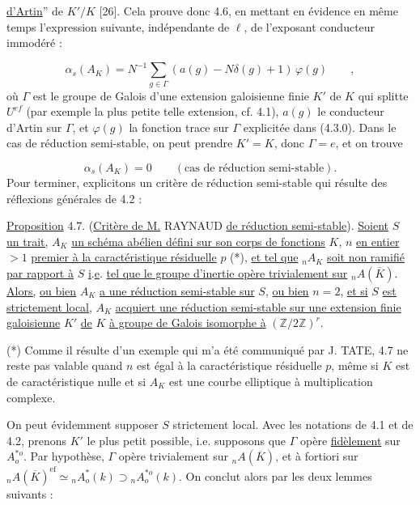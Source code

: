
\underline{d'Artin}'' de $K'/K$ [26]. Cela prouve donc 4.6, en mettant en évidence en même temps l'expression suivante, indépendante de $\ell$, de l'exposant conducteur immodéré :

\begin{equation}\tag{4.6.2}
\alpha_s(A_K) = N^{-1} \sum_{g \in \Gamma} (a(g)-N\delta(g)+1)\, \varphi(g) \qquad ,
\end{equation}
où $\Gamma$ est le groupe de Galois d'une extension galoisienne finie $K'$ de $K$ qui splitte $U^{ef}$ (par exemple la plus petite telle extension, cf. 4.1), $a(g)$ le conducteur d'Artin sur $\Gamma$, et $\varphi(g)$ la fonction trace sur $\Gamma$ explicitée dans (4.3.0). Dans le cas de réduction semi-stable, on peut prendre $K'=K$, donc $\Gamma = e$, et on trouve

\begin{equation}\tag{4.6.3}
\alpha_s(A_K) = 0 \qquad (\mbox{cas de réduction semi-stable}).
\end{equation}
Pour terminer, explicitons un critère de réduction semi-stable qui résulte des réflexions générales de 4.2 :

\underline{Proposition} 4.7. (\underline{Critère de M.} RAYNAUD \underline{de réduction semi-stable}). \underline{Soient} $S$ \underline{un trait,} $A_K$ \underline{un schéma abélien défini sur son corps de fonctions} $K$, $n$ \underline{en entier} $> 1$ \underline{premier à la caractéristique résiduelle} $p$ (*), \underline{et tel que} ${}_nA_K$ \underline{soit non ramifié par rapport à} $S$ \underline{i}.\underline{e}. \underline{tel que le groupe d'inertie opère trivialement sur} ${}_nA(\overline{K})$. \underline{Alors,} \underline{ou bien} $A_K$ \underline{a une réduction semi-stable sur} $S$, \underline{ou bien} $n = 2$, \underline{et si} $S$ \underline{est strictement local}, $A_K$ \underline{acquiert une réduction semi-stable sur une extension finie galoisienne} $K'$ \underline{de} $K$ \underline{à groupe de Galois isomorphe à} $(\mathbb{Z}/2\mathbb{Z})^r$.

(*) Comme il résulte d'un exemple qui m'a été communiqué par J. TATE, 4.7 ne reste pas valable quand $n$ est égal à la caractéristique résiduelle $p$, même si $K$ est de caractéristique nulle et si $A_K$ est une courbe elliptique à multiplication complexe.



On peut évidemment supposer $S$ strictement local. Avec les notations de 4.1 et de 4.2, prenons $K'$ le plus petit possible, i.e. supposons que $\Gamma$ opère \underline{fidèlement} sur $A^{*o}_o$. Par hypothèse, $\Gamma$ opère trivialement sur ${}_nA(\overline{K})$, et à fortiori sur ${}_nA(\overline{K})^{\mathrm{ef}} \simeq {}_nA^*_o(k) \supset {}_nA^{*o}_o(k)$. On conclut alors par les deux lemmes suivants :

